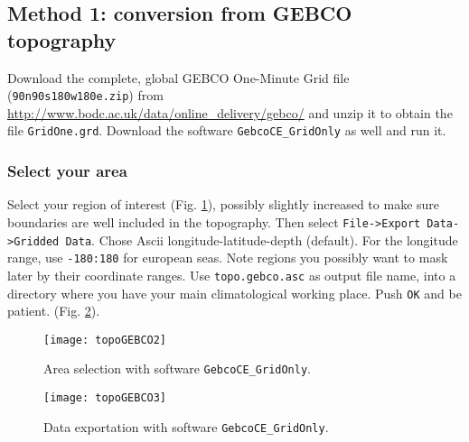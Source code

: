 \subsection{Method 1: conversion from GEBCO topography\label{sec:topogebco}}

Download the complete, global GEBCO One-Minute Grid file (\texttt{90n90s180w180e.zip}) from \url{http://www.bodc.ac.uk/data/online_delivery/gebco/} and unzip it to obtain the file \texttt{GridOne.grd}. Download the software \texttt{GebcoCE\_GridOnly} as well and run it. 

\subsubsection{Select your area}

Select your region of interest (Fig. \ref{fig:gebco1}), possibly slightly increased to make sure boundaries are well included in the topography. Then select {\tt File->Export Data->Gridded Data}. Chose Ascii longitude-latitude-depth (default). For the longitude range, use {\tt -180:180} for european seas. Note regions you possibly want to mask later by their coordinate ranges.  Use {\tt topo.gebco.asc} as output file name, into a directory where
you have your main climatological working place. Push {\tt OK} and be patient. (Fig. \ref{fig:gebco2}). 

\begin{figure}[htpb]
\centering
\texttt{[image: topoGEBCO2]}
\caption{Area selection with software \texttt{GebcoCE\_GridOnly}.\label{fig:gebco1}}
\end{figure}


\begin{figure}[htpb]
\centering
\texttt{[image: topoGEBCO3]}
\caption{Data exportation with software \texttt{GebcoCE\_GridOnly}.\label{fig:gebco2}}
\end{figure}



%


